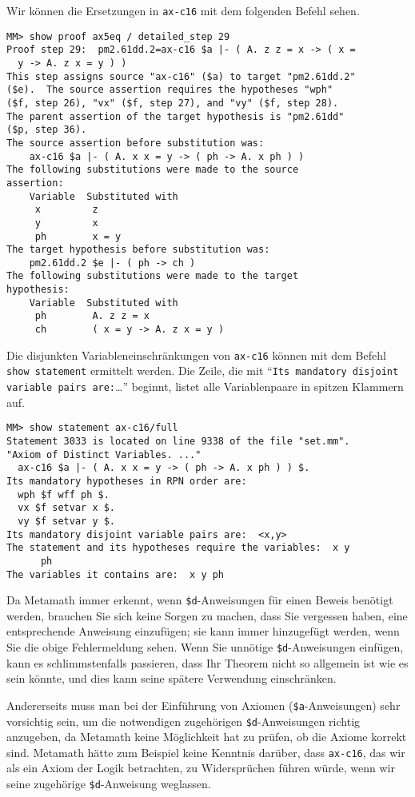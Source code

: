 Wir können die Ersetzungen in \texttt{ax-c16} mit dem folgenden Befehl sehen.

\begin{verbatim}
MM> show proof ax5eq / detailed_step 29
Proof step 29:  pm2.61dd.2=ax-c16 $a |- ( A. z z = x -> ( x =
  y -> A. z x = y ) )
This step assigns source "ax-c16" ($a) to target "pm2.61dd.2"
($e).  The source assertion requires the hypotheses "wph"
($f, step 26), "vx" ($f, step 27), and "vy" ($f, step 28).
The parent assertion of the target hypothesis is "pm2.61dd"
($p, step 36).
The source assertion before substitution was:
    ax-c16 $a |- ( A. x x = y -> ( ph -> A. x ph ) )
The following substitutions were made to the source
assertion:
    Variable  Substituted with
     x         z
     y         x
     ph        x = y
The target hypothesis before substitution was:
    pm2.61dd.2 $e |- ( ph -> ch )
The following substitutions were made to the target
hypothesis:
    Variable  Substituted with
     ph        A. z z = x
     ch        ( x = y -> A. z x = y )
\end{verbatim}

Die disjunkten Variableneinschränkungen von \texttt{ax-c16} können mit dem Befehl \texttt{show state\-ment} ermittelt werden.  Die Zeile, die mit "`\texttt{Its mandatory
dis\-joint var\-i\-able pairs are:}\ldots"' beginnt, listet alle Variablenpaare in spitzen Klammern auf.

\begin{verbatim}
MM> show statement ax-c16/full
Statement 3033 is located on line 9338 of the file "set.mm".
"Axiom of Distinct Variables. ..."
  ax-c16 $a |- ( A. x x = y -> ( ph -> A. x ph ) ) $.
Its mandatory hypotheses in RPN order are:
  wph $f wff ph $.
  vx $f setvar x $.
  vy $f setvar y $.
Its mandatory disjoint variable pairs are:  <x,y>
The statement and its hypotheses require the variables:  x y
      ph
The variables it contains are:  x y ph
\end{verbatim}

Da Metamath immer erkennt, wenn \texttt{\$d}-Anweisungen für einen Beweis benötigt werden, brauchen Sie sich keine Sorgen zu machen, dass Sie vergessen haben, eine entsprechende Anweisung einzufügen; sie kann immer hinzugefügt werden, wenn Sie die obige Fehlermeldung sehen.  Wenn Sie unnötige \texttt{\$d}-Anweisungen einfügen, kann es schlimmstenfalls passieren, dass Ihr Theorem nicht so allgemein ist wie es sein könnte, und dies kann seine spätere Verwendung einschränken.

Andererseits muss man bei der Einführung von Axiomen (\texttt{\$a}-Anweisungen) sehr vorsichtig sein, um die notwendigen zugehörigen \texttt{\$d}-Anweisungen richtig anzugeben, da Metamath keine Möglichkeit hat zu prüfen, ob die Axiome korrekt sind.  Metamath hätte zum Beispiel keine Kenntnis darüber, dass \texttt{ax-c16}, das wir als ein Axiom der Logik betrachten, zu Widersprüchen führen würde, wenn wir seine zugehörige \texttt{\$d}-Anweisung weglassen.

